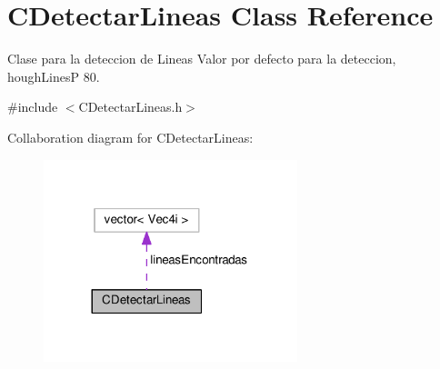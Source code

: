 \hypertarget{classCDetectarLineas}{}\section{C\+Detectar\+Lineas Class Reference}
\label{classCDetectarLineas}


Clase para la deteccion de Lineas Valor por defecto para la deteccion, hough\+LinesP 80.  




{\ttfamily \#include $<$C\+Detectar\+Lineas.\+h$>$}



Collaboration diagram for C\+Detectar\+Lineas\+:
\nopagebreak
\begin{figure}[H]
\begin{center}
\leavevmode
\includegraphics[width=209pt]{classCDetectarLineas__coll__graph}
\end{center}
\end{figure}
